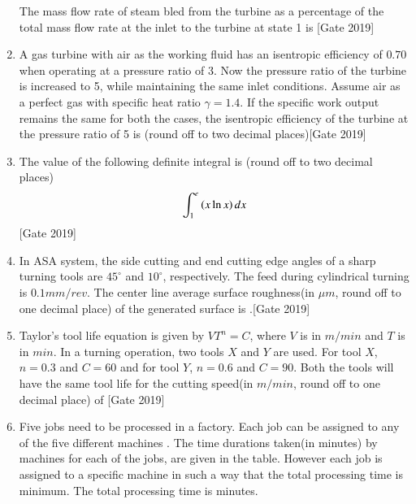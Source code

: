 \documentclass[journal]{IEEEtran}
\begin{document}
\begin{enumerate}
\begin{figure}[h]
\end{figure} 
The mass flow rate of steam bled from the turbine as a percentage of the total mass flow rate at the inlet to the turbine at state 1 is \underline{\hspace{2cm}}\hfill{[Gate 2019]}
	\item A gas turbine with air as the working fluid has an isentropic efficiency of $0.70$ when operating at a pressure ratio of $3$. Now the pressure ratio of the turbine is increased to 5, while maintaining the same inlet conditions. Assume air as a perfect gas with specific heat ratio $\gamma = 1.4$. If the specific work output remains the same for both the cases, the isentropic efficiency of the turbine at the pressure ratio of 5 is \underline{\hspace{2cm}}(round off to two decimal places)\hfill{[Gate 2019]}
	\item The value of the following definite integral is \underline{\hspace{2cm}}(round off to two decimal places)
	\begin{align}
	\int_1^e \left(x\ln{x}\right)dx \notag
	\end{align}\hfill{[Gate 2019]}
	\item In ASA system, the side cutting and end cutting edge angles of a sharp turning tools are $45^{\circ}$ and $10^{\circ}$, respectively. The feed during cylindrical turning is $0.1mm/{rev}$. The center line average surface roughness(in $\mu m$, round off to one decimal place) of the generated surface is \underline{\hspace{2cm}}.\hfill{[Gate 2019]}
	\item Taylor's tool life equation is given by $VT^n = C$, where $V$ is in $m/{min}$ and $T$ is in $min$. In a turning operation, two tools $X$ and $Y$ are used. For tool $X$, $n = 0.3$ and $C=60$ and for tool $Y$, $n=0.6$ and $C=90$. Both the tools will have the same tool life for the cutting speed(in $m/min$, round off to one decimal place) of \underline{\hspace{2cm}}\hfill{[Gate 2019]}
	\item Five jobs  need to be processed in a factory. Each job can be assigned to any of the five different machines . The time durations taken(in minutes) by machines for each of the jobs, are given in the table. However each job is assigned to a specific machine in such a way that the total processing time is minimum. The total processing time is \underline{\hspace{2cm}} minutes.

\end{enumerate}
\end{document}
